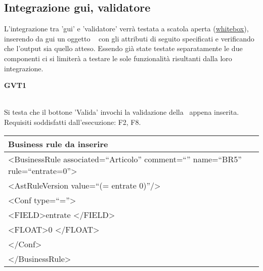 \subsection{Integrazione gui, validatore}
L'integrazione tra 'gui' e 'validatore' verr\`a testata a scatola aperta (\underline{whitebox}), inserendo da gui  un oggetto \textit{\br\ } con gli attributi di seguito specificati e verificando che l'output sia quello atteso. Essendo gi\`a state testate separatamente le due componenti ci si limiter\`a a testare le sole funzionalit\`a risultanti dalla loro integrazione.\\

\begin{Large}\textbf{GVT1}\end{Large} \\
Si testa che il bottone 'Valida' invochi la validazione della \br\ appena inserita.
Requisiti soddisfatti dall'esecuzione: F2, F8.\\
\begin{center}
\begin{tabular}{|p{11cm}|} \hline
\textbf{Business rule da inserire}\\ \hline
\textless BusinessRule associated=``Articolo'' comment=``'' name=``BR5'' rule=``entrate=0''\textgreater \\
\textless AstRuleVersion value=``(= entrate 0)''/\textgreater \\
 \textless Conf type=``=''\textgreater \\
 \textless FIELD\textgreater entrate \textless /FIELD\textgreater \\
 \textless FLOAT\textgreater 0 \textless /FLOAT\textgreater \\
 \textless /Conf\textgreater \\
\textless /BusinessRule\textgreater \\ \hline
\end{tabular} \\
\end{center}


